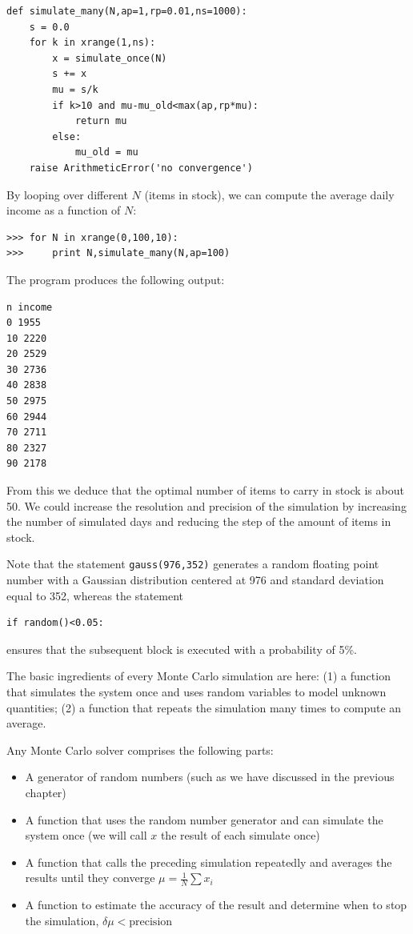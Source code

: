 \documentclass[justified,sixbynine]{tufte-book}
\def\ft{\small\tt}
\theoremstyle{plain}%
\theoremstyle{definition}
\theoremstyle{remark}
\begin{document}
\begin{fullwidth}
\begin{lstlisting}
def simulate_many(N,ap=1,rp=0.01,ns=1000):
    s = 0.0
    for k in xrange(1,ns):
        x = simulate_once(N)
        s += x
        mu = s/k
        if k>10 and mu-mu_old<max(ap,rp*mu):
            return mu
        else:
            mu_old = mu
    raise ArithmeticError('no convergence')
\end{lstlisting}

By looping over different $N$ (items in stock), we can compute the average daily income as a function of $N$:
\begin{lstlisting}
>>> for N in xrange(0,100,10):
>>>     print N,simulate_many(N,ap=100)
\end{lstlisting}

The program produces the following output:
\begin{lstlisting}
n income
0 1955
10 2220
20 2529
30 2736
40 2838
50 2975
60 2944
70 2711
80 2327
90 2178
\end{lstlisting}

From this we deduce that the optimal number of items to carry in stock is
about 50. We could increase the resolution and precision of the simulation
by increasing the number of simulated days and reducing the step of the
amount of items in stock.

Note that the statement {\ft gauss(976,352)} generates a random floating
point number with a Gaussian distribution centered at 976 and standard
deviation equal to 352, whereas the statement
\begin{lstlisting}
if random()<0.05:
\end{lstlisting}

ensures that the subsequent block is executed with a probability of 5\%.

The basic ingredients of every Monte Carlo simulation are here: (1) a function that simulates the system once and uses random variables to model unknown quantities; (2) a function that repeats the simulation many times to compute an average.

Any Monte Carlo solver comprises the following parts:

\begin{itemize}
\item A generator of random numbers (such as we have discussed in the previous chapter)
\item A function that uses the random number generator and can simulate the system once (we will call $x$ the result of each simulate once)
\item A function that calls the preceding simulation repeatedly and averages the results until they converge $\mu = \frac1N \sum x_i$
\item A function to estimate the accuracy of the result and determine when to stop the simulation, $\delta\mu < \textrm{precision}$
\end{itemize}


\end{fullwidth}
\end{document}
